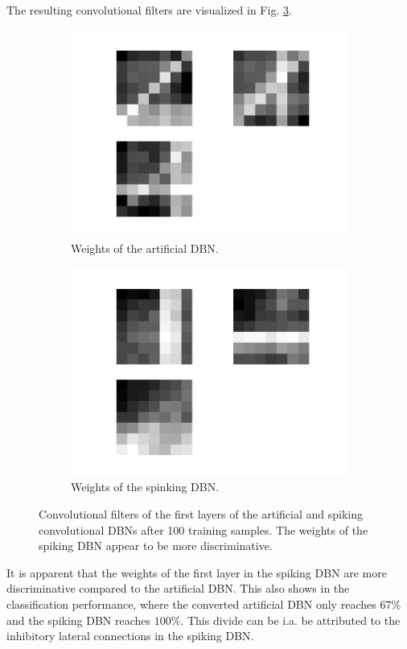The resulting convolutional filters are visualized in Fig. \ref{fig:convvsnoconv}. 

 \begin{figure}[h!]
	\centering
	\begin{subfigure}[t]{.45\textwidth}
  		\centering
  		\includegraphics[width=.9\linewidth]{imgs/vs/w_rbm.png}
  		\caption{Weights of the artificial DBN.}
  		\label{fig:sub1}
	\end{subfigure}%
	\begin{subfigure}[t]{.45\textwidth}
  		\centering
  		\includegraphics[width=.9\linewidth]{imgs/vs/w_spike.png}
  		\caption{Weights of the spinking DBN.}
  		\label{fig:sub2}
	\end{subfigure}
	\caption[Convolutional filters of the first layers of the artificial and spiking convolutional DBNs.]{Convolutional filters of the first layers of the artificial and spiking convolutional DBNs after 100 training samples. The weights of the spiking DBN appear to be more discriminative.}
	\label{fig:convvsnoconv}
\end{figure}

It is apparent that the weights of the first layer in the spiking DBN are more discriminative compared to the artificial DBN.
This also shows in the classification performance, where the converted artificial DBN only reaches $67 \%$ and the spiking DBN reaches $100 \%$.
This divide can be i.a. be attributed to the inhibitory lateral connections in the spiking DBN.  
